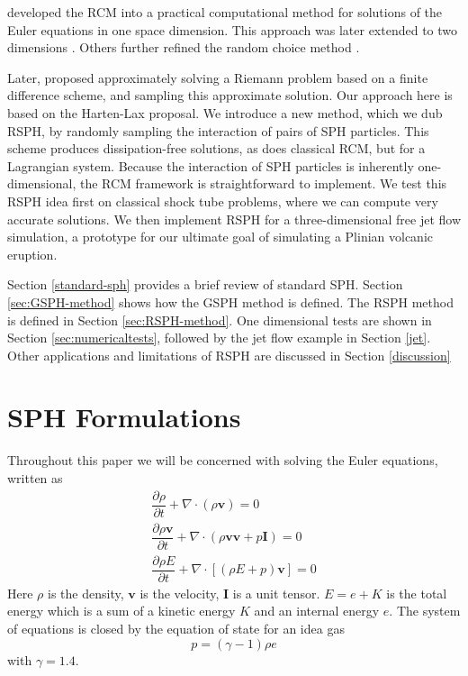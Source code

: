 \citet{chorin1976random} developed the RCM into a practical computational method for solutions of the Euler equations in one space dimension. This approach was later extended to two dimensions \citep{chorinporousmedium}. Others further refined the random choice method \citep{sod1977numerical,concus1979numerical,colella1982glimm, freistuhler1992numerical,toro2013riemann}. 

Later, \citet{hartenlax} proposed approximately solving a Riemann problem based on a finite difference scheme, and sampling this approximate solution. Our approach here is based on the Harten-Lax proposal. We introduce a new method, which we dub RSPH, by randomly sampling the interaction of pairs of SPH particles. This scheme produces dissipation-free solutions, as does classical RCM, but for a Lagrangian system. Because the interaction of SPH particles is inherently one-dimensional, the RCM framework is straightforward to implement. We test this RSPH idea first on classical shock tube problems, where we can compute very accurate solutions.
We then implement RSPH for a three-dimensional free jet flow simulation, a prototype for our ultimate goal of simulating a Plinian volcanic eruption.

Section \ref{standard-sph} provides a brief review of standard SPH. Section \ref{sec:GSPH-method} shows how the GSPH method is defined. The RSPH method is defined in Section \ref{sec:RSPH-method}.
One dimensional tests are shown in Section \ref{sec:numericaltests}, followed by the jet flow example in Section \ref{jet}. Other applications and limitations of RSPH are discussed in Section \ref{discussion}

\section{SPH Formulations} \label{sph}
Throughout this paper we will be concerned with solving the Euler equations, written as
\begin{align}
\dfrac{\partial \rho}{\partial t} + \nabla \cdot \left(\rho \textbf{v} \right) = 0 \label{eq:gov-cs-rho} \\
\dfrac{\partial \rho \textbf{v}}{\partial t} + \nabla \cdot \left(\rho \textbf{v} \textbf{v} + p\textbf{I}\right) = 0 \label{eq:gov-cs-v} \\
\dfrac{\partial \rho E}{\partial t} + \nabla \cdot \left[\left(\rho E + p \right)\textbf{v}\right] = 0 \label{eq:gov-cs-e}
\end{align}
Here $\rho$ is the density, $\textbf{v}$ is the velocity, $\textbf{I}$ is a unit tensor.
$E = e + K $ is the total energy which is a sum of a kinetic energy $K$ and an internal energy $e$.
The system of equations is closed by the equation of state for an idea gas
\begin{equation}
p = \left(\gamma - 1\right)\rho e \label{eq:EOS}
\end{equation}
with $\gamma=1.4$.

